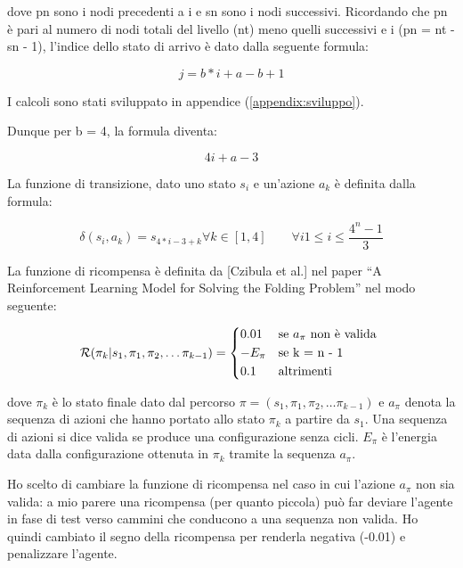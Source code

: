 \documentclass[conference]{IEEEtran}
\begin{document}
dove pn sono i nodi precedenti a i e sn sono i nodi successivi. Ricordando che pn è pari al numero di nodi totali del livello (nt) meno quelli successivi e i (pn = nt - sn - 1), l'indice dello stato di arrivo è dato dalla seguente formula:

\begin{equation}
j = b*i + a - b + 1
\end{equation}

I calcoli sono stati sviluppato in appendice (\ref{appendix:sviluppo}).

Dunque per b = 4, la formula diventa:

\begin{equation}
\tag{Funzione di transizione}
4i + a - 3
\end{equation}

La funzione di transizione, dato uno stato $s_i$ e un'azione $a_k$ è definita dalla formula:

\begin{equation}
\delta(s_i, a_k) = s_{4*i - 3 + k} \forall k \in [1,4] \qquad \forall i 1 \leq i \leq \frac{4^n - 1}{3}
\end{equation}

La funzione di ricompensa è definita da [Czibula et al.] nel paper ``A Reinforcement Learning Model for Solving the Folding Problem'' nel modo seguente:

\begin{equation}
    \label{eq:rew}
    \mathcal{R}(\pi_k| s_1, \pi_1, \pi_2, \dots \pi_{k-1}) =
    \begin{cases*}
      0.01 & se $a_{\pi}$ non è valida \\
      - E_{\pi} & se k = n - 1 \\
      0.1 & altrimenti
    \end{cases*}
\end{equation}

dove $\pi_k$ è lo stato finale dato dal percorso $\pi = (s_1, \pi_1, \pi_2, \dots \pi_{k-1})$ e $a_{\pi}$ denota la sequenza di azioni che hanno portato allo stato $\pi_k$ a partire da $s_1$. Una sequenza di azioni si dice valida se produce una configurazione senza cicli. $E_{\pi}$ è l'energia data dalla configurazione ottenuta in $\pi_k$ tramite la sequenza $a_{\pi}$.

Ho scelto di cambiare la funzione di ricompensa nel caso in cui l'azione $a_{\pi}$ non sia valida: a mio parere una ricompensa (per quanto piccola) può far deviare l'agente in fase di test verso cammini che conducono a una sequenza non valida. Ho quindi cambiato il segno della ricompensa per renderla negativa (-0.01) e penalizzare l'agente.
\end{document}
